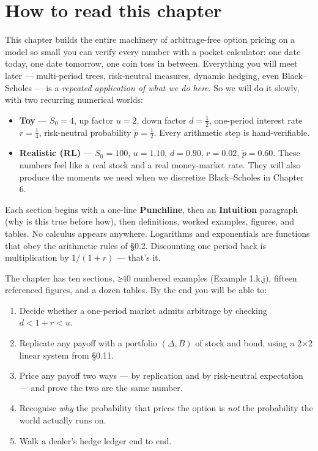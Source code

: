 \documentclass[
  10pt,
  twoside]{book}
\providecommand{\tightlist}{%
  \setlength{\itemsep}{0pt}\setlength{\parskip}{0pt}}
\begin{document}
\section{How to read this chapter}\label{how-to-read-this-chapter-1}

This chapter builds the entire machinery of arbitrage-free option
pricing on a model so small you can verify every number with a pocket
calculator: one date today, one date tomorrow, one coin toss in between.
Everything you will meet later --- multi-period trees, risk-neutral
measures, dynamic hedging, even Black--Scholes --- is a \emph{repeated
application of what we do here}. So we will do it slowly, with two
recurring numerical worlds:

\begin{itemize}
\tightlist
\item
  \textbf{Toy} --- \(S_0=4\), up factor \(u=2\), down factor
  \(d=\tfrac{1}{2}\), one-period interest rate \(r=\tfrac{1}{4}\),
  risk-neutral probability \(\tilde p=\tfrac{1}{2}\). Every arithmetic
  step is hand-verifiable.
\item
  \textbf{Realistic (RL)} --- \(S_0=100\), \(u=1.10\), \(d=0.90\),
  \(r=0.02\), \(\tilde p=0.60\). These numbers feel like a real stock
  and a real money-market rate. They will also produce the moments we
  need when we discretize Black--Scholes in Chapter 6.
\end{itemize}

Each section begins with a one-line \textbf{Punchline}, then an
\textbf{Intuition} paragraph (why is this true before how), then
definitions, worked examples, figures, and tables. No calculus appears
anywhere. Logarithms and exponentials are functions that obey the
arithmetic rules of §0.2. Discounting one period back is multiplication
by \(1/(1+r)\) --- that's it.

The chapter has ten sections, ≥40 numbered examples (Example 1.k.j),
fifteen referenced figures, and a dozen tables. By the end you will be
able to:

\begin{enumerate}
\def\labelenumi{\arabic{enumi}.}
\tightlist
\item
  Decide whether a one-period market admits arbitrage by checking
  \(d<1+r<u\).
\item
  Replicate any payoff with a portfolio \((\Delta,B)\) of stock and
  bond, using a 2×2 linear system from §0.11.
\item
  Price any payoff two ways --- by replication and by risk-neutral
  expectation --- and prove the two are the same number.
\item
  Recognise \emph{why} the probability that prices the option is
  \emph{not} the probability the world actually runs on.
\item
  Walk a dealer's hedge ledger end to end.
\end{enumerate}
\end{document}
